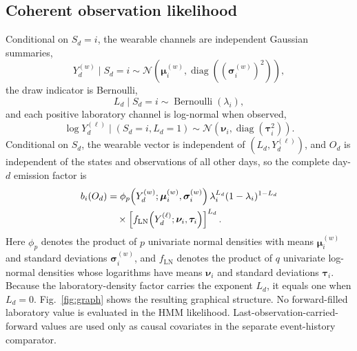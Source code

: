 \documentclass{ieeeaccess}
\newcommand{\vect}[1]{\bm{#1}}
\begin{document}
\subsection{Coherent observation likelihood}\label{sec:likelihood}
Conditional on $S_d=i$, the wearable channels are independent Gaussian summaries,
\begin{equation}
Y_d^{(w)}\mid S_d=i\sim\mathcal N(\vect{\mu}_i^{(w)},\operatorname{diag}((\vect{\sigma}_i^{(w)})^2)),
\end{equation}
the draw indicator is Bernoulli,
\begin{equation}
L_d\mid S_d=i\sim\operatorname{Bernoulli}(\lambda_i),
\end{equation}
and each positive laboratory channel is log-normal when observed,
\begin{equation}
\log Y_d^{(\ell)}\mid(S_d=i,L_d=1)
\sim\mathcal N(\vect{\nu}_i,\operatorname{diag}(\vect{\tau}_i^2)).
\end{equation}
Conditional on $S_d$, the wearable vector is independent of $(L_d,Y_d^{(\ell)})$, and $O_d$ is independent of the states and observations of all other days, so the complete day-$d$ emission factor is
\begin{align}
 b_i(O_d)&=\phi_p\!\left(Y_d^{(w)};\vect{\mu}_i^{(w)},\vect{\sigma}_i^{(w)}\right)
 \lambda_i^{L_d}(1-\lambda_i)^{1-L_d} \notag\\
 &\quad\times\left[f_{\mathrm{LN}}\!\left(Y_d^{(\ell)};\vect{\nu}_i,\vect{\tau}_i\right)\right]^{L_d}.
 \label{eq:emission}
\end{align}
Here $\phi_p$ denotes the product of $p$ univariate normal densities with means $\vect{\mu}_i^{(w)}$ and standard deviations $\vect{\sigma}_i^{(w)}$, and $f_{\mathrm{LN}}$ denotes the product of $q$ univariate log-normal densities whose logarithms have means $\vect{\nu}_i$ and standard deviations $\vect{\tau}_i$. Because the laboratory-density factor carries the exponent $L_d$, it equals one when $L_d=0$. Fig.~\ref{fig:graph} shows the resulting graphical structure. No forward-filled laboratory value is evaluated in the HMM likelihood. Last-observation-carried-forward values are used only as causal covariates in the separate event-history comparator.
\end{document}

